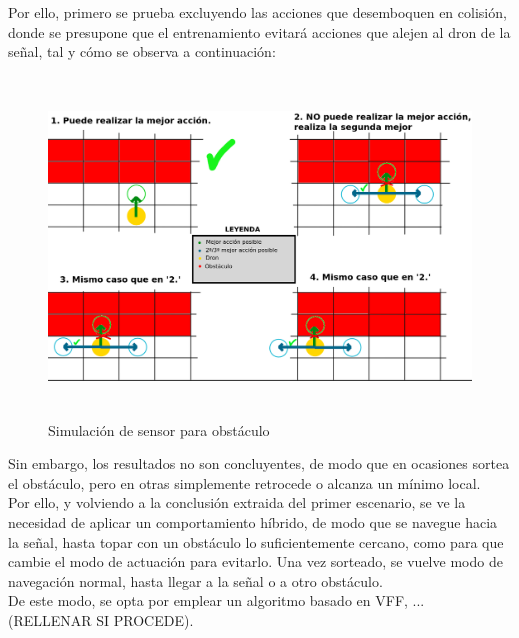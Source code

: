 Por ello, primero se prueba excluyendo las acciones que desemboquen en colisión, donde se presupone que el entrenamiento evitará acciones que alejen al dron de la señal, tal y cómo se observa a continuación:

\begin{figure} [H]
    \begin{center}
    \includegraphics[height=9cm]{imagenes/cap4/28_pseudosensor.png}
    \end{center}
    \caption[Simulación de sensor para obstáculo]{Simulación de sensor para obstáculo}
    \label{fig:pseudosensor}
\end{figure}

Sin embargo, los resultados no son concluyentes, de modo que en ocasiones sortea el obstáculo, pero en otras simplemente retrocede o alcanza un mínimo local.\\

Por ello, y volviendo a la conclusión extraida del primer escenario, se ve la necesidad de aplicar un comportamiento híbrido, de modo que se navegue hacia la señal, hasta topar con un obstáculo lo suficientemente cercano, como para que cambie el modo de actuación para evitarlo. Una vez sorteado, se vuelve modo de navegación normal, hasta llegar a la señal o a otro obstáculo.\\

De este modo, se opta por emplear un algoritmo basado en \ac{VFF}, ... (RELLENAR SI PROCEDE).